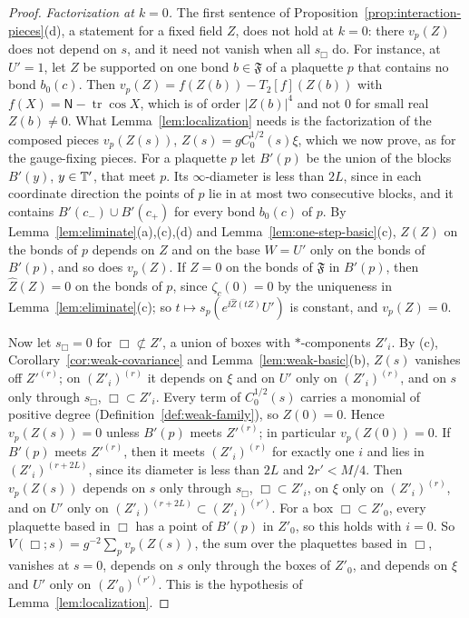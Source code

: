 \begin{proof}
\emph{Factorization at $k=0$.} The first sentence of Proposition~\ref{prop:interaction-pieces}(d), a statement for a fixed field $Z$, does not hold at $k=0$: there $v_p(Z)$ does not depend on $s$, and it need not vanish when all $s_\Box$ do. For instance, at $U'=1$, let $Z$ be supported on one bond $b\in\mathfrak F$ of a plaquette $p$ that contains no bond $b_0(c)$. Then $v_p(Z)=f(Z(b))-T_2[f](Z(b))$ with $f(X)=\mathsf N-\operatorname{tr}\cos X$, which is of order $|Z(b)|^4$ and not $0$ for small real $Z(b)\ne0$. What Lemma~\ref{lem:localization} needs is the factorization of the composed pieces $v_p(Z(s))$, $Z(s)=gC_0^{1/2}(s)\xi$, which we now prove, as for the gauge-fixing pieces. For a plaquette $p$ let $B'(p)$ be the union of the blocks $B'(y)$, $y\in\mathbb T'$, that meet $p$. Its $\infty$-diameter is less than $2L$, since in each coordinate direction the points of $p$ lie in at most two consecutive blocks, and it contains $B'(c_-)\cup B'(c_+)$ for every bond $b_0(c)$ of $p$. By Lemma~\ref{lem:eliminate}(a),(c),(d) and Lemma~\ref{lem:one-step-basic}(c), $\hat Z(Z)$ on the bonds of $p$ depends on $Z$ and on the base $W=U'$ only on the bonds of $B'(p)$, and so does $v_p(Z)$. If $Z=0$ on the bonds of $\mathfrak F$ in $B'(p)$, then $\hat Z(Z)=0$ on the bonds of $p$, since $\zeta_c(0)=0$ by the uniqueness in Lemma~\ref{lem:eliminate}(c); so $t\mapsto s_p(e^{\ii\hat Z(tZ)}U')$ is constant, and $v_p(Z)=0$.

Now let $s_\Box=0$ for $\Box\not\subset Z'$, a union of boxes with $*$-components $Z'_i$. By (c), Corollary~\ref{cor:weak-covariance} and Lemma~\ref{lem:weak-basic}(b), $Z(s)$ vanishes off $Z'^{(r)}$; on $(Z'_i)^{(r)}$ it depends on $\xi$ and on $U'$ only on $(Z'_i)^{(r)}$, and on $s$ only through $s_\Box$, $\Box\subset Z'_i$. Every term of $C_0^{1/2}(s)$ carries a monomial of positive degree (Definition~\ref{def:weak-family}), so $Z(0)=0$. Hence $v_p(Z(s))=0$ unless $B'(p)$ meets $Z'^{(r)}$; in particular $v_p(Z(0))=0$. If $B'(p)$ meets $Z'^{(r)}$, then it meets $(Z'_i)^{(r)}$ for exactly one $i$ and lies in $(Z'_i)^{(r+2L)}$, since its diameter is less than $2L$ and $2r'<M/4$. Then $v_p(Z(s))$ depends on $s$ only through $s_\Box$, $\Box\subset Z'_i$, on $\xi$ only on $(Z'_i)^{(r)}$, and on $U'$ only on $(Z'_i)^{(r+2L)}\subset(Z'_i)^{(r')}$. For a box $\Box\subset Z'_0$, every plaquette based in $\Box$ has a point of $B'(p)$ in $Z'_0$, so this holds with $i=0$. So $V(\Box;s)=g^{-2}\sum_pv_p(Z(s))$, the sum over the plaquettes based in $\Box$, vanishes at $s=0$, depends on $s$ only through the boxes of $Z'_0$, and depends on $\xi$ and $U'$ only on $(Z'_0)^{(r')}$. This is the hypothesis of Lemma~\ref{lem:localization}.


\end{proof}
